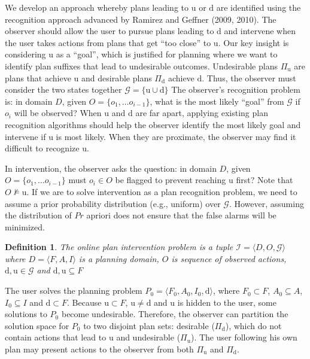 \documentclass[letterpaper]{article}
\theoremstyle{plain}
\newtheorem{definition}{Definition}
\begin{document}
We develop an approach whereby plans leading to $\mathrm{u}$ or $\mathrm{d}$ are identified using the recognition approach advanced by Ramirez and Geffner (2009, 2010).
The observer should allow the user to pursue plans leading to $\mathrm{d}$ and intervene when the user takes actions from plans that get ``too close'' to $\mathrm{u}$.
Our key insight is considering $\mathrm{u}$ as a ``goal'', which is justified for planning where we want to identify plan suffixes that lead to undesirable outcomes. 
Undesirable plans $\Pi_{\mathrm{u}}$ are plans that achieve $\mathrm{u}$ and desirable plans $\Pi_{\mathrm{d}}$ achieve $\mathrm{d}$. 
Thus, the observer must consider the two states together $\mathcal{G}=\lbrace\mathrm{u} \cup \mathrm{d}\rbrace$
The observer's recognition problem is: in domain $D$, given $O = \lbrace o_1, \ldots o_{i-1}\rbrace$, what is the most likely ``goal'' from $\mathcal{G}$ if $o_i$ will be observed? 
When $\mathrm{u}$ and $\mathrm{d}$ are far apart, applying existing plan recognition algorithms should help the observer identify the most likely goal and intervene if $\mathrm{u}$ is most likely. When they are proximate, the observer may find it difficult to recognize $\mathrm{u}$. 


In intervention, the observer asks the question: in domain $D$, given $O = \lbrace o_1, \ldots o_{i-1}\rbrace$ must $o_i \in O$ be flagged to prevent reaching $\mathrm{u}$ first?
Note that $O\not\models\mathrm{u}$. 
If we are to solve intervention as a plan recognition problem, we need to assume a prior probability distribution (e.g., uniform) over $\mathcal{G}$. However, assuming the distribution of $Pr$ apriori does not ensure that the false alarms will be minimized. 

\theoremstyle{definition}
\begin{definition}
The \textnormal{online plan intervention problem} is a tuple $\mathcal{I} = \langle D, O, \mathcal{G} \rangle$ where $D=\langle F, A, I \rangle$ is a planning domain, 
$O$ is  sequence of observed actions, $\mathrm{d},\mathrm{u} \in \mathcal{G}$ and 
$\mathrm{d}, \mathrm{u} \subseteq F$
\end{definition}
The user solves the planning problem $P_0=\langle F_0, A_0, I_0,\mathrm{d}\rangle$, where $F_0 \subset F$, $A_0\subseteq A$, $I_0 \subseteq I$ and $\mathrm{d}\subset F$. 
Because $\mathrm{u}\subset F$, $\mathrm{u}\neq \mathrm{d}$ and $\mathrm{u}$ is hidden to the user, some solutions to $P_0$ become undesirable. Therefore, the observer can partition the solution space for $P_0$ to two disjoint plan sets: desirable ($\Pi_{\mathrm{d}}$), which do not contain actions that lead to $\mathrm{u}$ and undesirable ($\Pi_{\mathrm{u}}$). The user following his own plan may present actions to the observer from both $\Pi_{\mathrm{u}}$ and $\Pi_{\mathrm{d}}$. 
\end{document}
